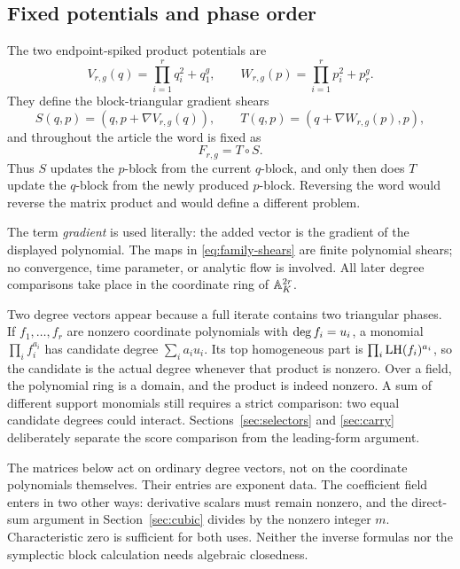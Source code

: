\documentclass[11pt]{article}
\theoremstyle{remark}
\numberwithin{equation}{section}
\begin{document}
\subsection{Fixed potentials and phase order}

The two endpoint-spiked product potentials are
\begin{equation}\label{eq:family-potentials}
V_{r,g}(q)=\prod_{i=1}^{r}q_i^2+q_1^g,
\qquad
W_{r,g}(p)=\prod_{i=1}^{r}p_i^2+p_r^g.
\end{equation}
They define the block-triangular gradient shears
\begin{equation}\label{eq:family-shears}
S(q,p)=(q,p+\nabla V_{r,g}(q)),
\qquad
T(q,p)=(q+\nabla W_{r,g}(p),p),
\end{equation}
and throughout the article the word is fixed as
\begin{equation}\label{eq:family-word}
F_{r,g}=T\circ S.
\end{equation}
Thus \(S\) updates the \(p\)-block from the current \(q\)-block, and only
then does \(T\) update the \(q\)-block from the newly produced
\(p\)-block.  Reversing the word would reverse the matrix product and would
define a different problem.

The term \emph{gradient} is used literally: the added vector is the gradient
of the displayed polynomial.  The maps in \eqref{eq:family-shears} are
finite polynomial shears; no convergence, time parameter, or analytic flow
is involved.  All later degree comparisons take place in the coordinate
ring of \(\mathbb{A}_K^{2r}\).

Two degree vectors appear because a full iterate contains two triangular
phases.  If \(f_1,\ldots,f_r\) are nonzero coordinate polynomials with
\(\operatorname{deg} f_i=u_i\), a monomial
\(\prod_i f_i^{a_i}\) has candidate degree \(\sum_i a_iu_i\).  Its top
homogeneous part is \(\prod_i\operatorname{LH}(f_i)^{a_i}\), so the candidate is the
actual degree whenever that product is nonzero.  Over a field, the
polynomial ring is a domain, and the product is indeed nonzero.  A sum of
different support monomials still requires a strict comparison: two equal
candidate degrees could interact.  Sections~\ref{sec:selectors} and
\ref{sec:carry} deliberately separate the score comparison from the
leading-form argument.

The matrices below act on ordinary degree vectors, not on the coordinate
polynomials themselves.  Their entries are exponent data.  The coefficient
field enters in two other ways: derivative scalars must remain nonzero, and
the direct-sum argument in Section~\ref{sec:cubic} divides by the nonzero
integer \(m\).  Characteristic zero is sufficient for both uses.  Neither
the inverse formulas nor the symplectic block calculation needs algebraic
closedness.
\end{document}
